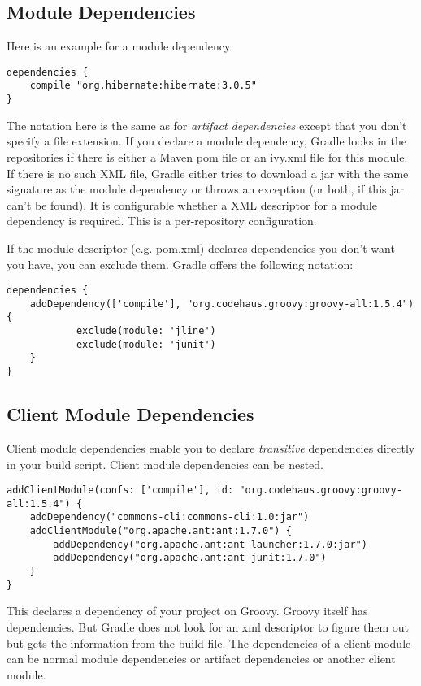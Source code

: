 \subsection{Module Dependencies} %
\label{sub:module_dependencies}
Here is an example for a module dependency:
\begin{Verbatim}
dependencies {
	compile "org.hibernate:hibernate:3.0.5"
}
\end{Verbatim}
The notation here is the same as for \emph{artifact dependencies} except that you don't specify a file extension. If you declare a module dependency, Gradle looks in the repositories if there is either a Maven pom file or an ivy.xml file for this module. If there is no such XML file, Gradle either tries to download a jar with the same signature as the module dependency or throws an exception (or both, if this jar can't be found). It is configurable whether a XML descriptor for a module dependency is required. This is a per-repository configuration.

If the module descriptor (e.g. pom.xml) declares dependencies you don't want you have, you can exclude them. Gradle offers the following notation:
\begin{Verbatim}
dependencies {
	addDependency(['compile'], "org.codehaus.groovy:groovy-all:1.5.4") {
	        exclude(module: 'jline')
	        exclude(module: 'junit')
	}
}
\end{Verbatim}

\subsection{Client Module Dependencies} %
\label{sub:client_module_dependencies}
Client module dependencies enable you to declare \emph{transitive} dependencies directly in your build script. Client module dependencies can be nested.
\begin{Verbatim}
addClientModule(confs: ['compile'], id: "org.codehaus.groovy:groovy-all:1.5.4") {
    addDependency("commons-cli:commons-cli:1.0:jar")
    addClientModule("org.apache.ant:ant:1.7.0") {
        addDependency("org.apache.ant:ant-launcher:1.7.0:jar")
        addDependency("org.apache.ant:ant-junit:1.7.0")
    }
}
\end{Verbatim}
This declares a dependency of your project on Groovy. Groovy itself has dependencies. But Gradle does not look for an xml descriptor to figure them out but gets the information from the build file. The dependencies of a client module can be normal module dependencies or artifact dependencies or another client module.

